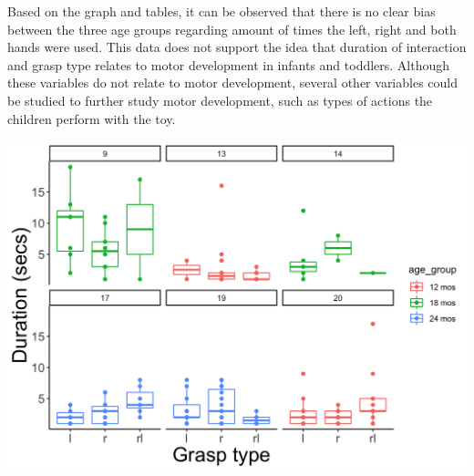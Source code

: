 \documentclass[landscape,final,paperwidth=48in,paperheight=33in,fontscale=0.285]{baposter}
\begin{document}
\begin{poster}
{}
    {
\par 

\par Based on the graph and tables, it can be observed that there is no clear bias between the three age groups regarding amount of times the left, right and both hands were used. This data does not support the idea that duration of interaction and grasp type relates to motor development in infants and toddlers. 
Although these variables do not relate to motor development, several other variables could be studied to further study motor development, such as types of actions the children perform with the toy. 
}
    {
 \begin{center}
 \vspace{0.3em}
 \includegraphics[scale=0.35,valign=t]{hand-touch-which-hand-1.png}
 \vspace{0.3em}
 \end{center}
 }


\end{poster}
\end{document}
